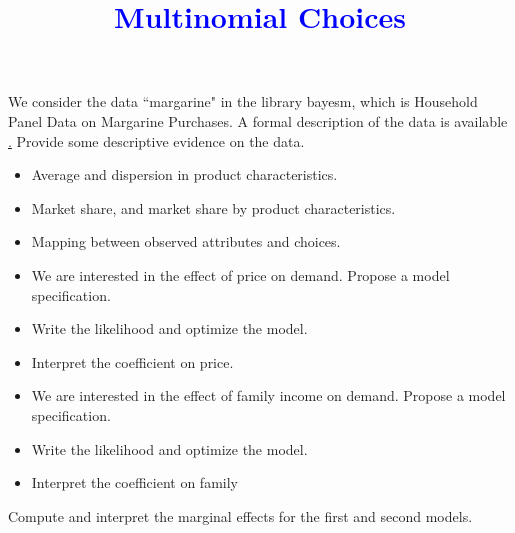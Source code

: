\documentclass[10pt,a4paper]{article}
\newcommand{\1}{\mathds{1}}
\begin{document}
\doublespacing

\title{\textcolor{blue}{Multinomial Choices}}
\maketitle


\begin{Exercise}[title=Data Description]
We consider the data ``margarine" in the library bayesm, which is Household Panel Data on Margarine Purchases. 
A formal description of the data is available \href{https://www.rdocumentation.org/packages/bayesm/versions/3.0-2/topics/margarine}. Provide some descriptive evidence on the data.
\begin{itemize}
\item Average and dispersion in product characteristics.
\item Market share, and market share by product characteristics.
\item Mapping between observed attributes and choices. 
\end{itemize}
\end{Exercise}

\begin{Exercise}[title=First Model]

\begin{itemize}
\item We are interested in the effect of price on demand. Propose a model specification.
\item Write the likelihood and optimize the model.
\item Interpret the coefficient on price. 
\end{itemize}
\end{Exercise}

\begin{Exercise}[title=Second Model]
\begin{itemize}
\item We are interested in the effect of family income on demand. Propose a model specification.
\item Write the likelihood and optimize the model.
\item Interpret the coefficient on family
\end{itemize}
\end{Exercise}

\begin{Exercise}[title=Marginal Effects]
Compute and interpret the marginal effects for the first and second models.
\end{Exercise}
\end{document}
